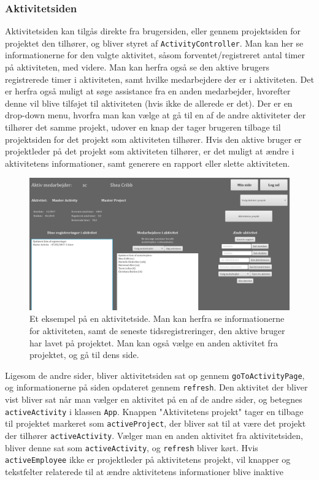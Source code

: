 
\subsubsection{Aktivitetsiden}
Aktivitetsiden kan tilgås direkte fra brugersiden, eller gennem projektsiden for projektet den tilhører, og bliver styret af \texttt{ActivityController}. Man kan her se informationerne for den valgte aktivitet, såsom forventet/registreret antal timer på aktiviteten, med videre. Man kan herfra også se den aktive brugers registrerede timer i aktiviteten, samt hvilke medarbejdere der er i aktiviteten. Det er herfra også muligt at søge assistance fra en anden medarbejder, hvorefter denne vil blive tilføjet til aktiviteten (hvis ikke de allerede er det). Der er en drop-down menu, hvorfra man kan vælge at gå til en af de andre aktiviteter der tilhører det samme projekt, udover en knap der tager brugeren tilbage til projektsiden for det projekt som aktiviteten tilhører. Hvis den aktive bruger er projektleder på det projekt som aktiviteten tilhører, er det muligt at ændre i aktivitetens informationer, samt generere en rapport eller slette aktiviteten. 

\begin{figure}[H]
    \centering
    \includegraphics[width = \textwidth]{Figurer/activityPage}
    \caption{Et eksempel på en aktivitetside. Man kan herfra se informationerne for aktiviteten, samt de seneste tidsregistreringer, den aktive bruger har lavet på projektet. Man kan også vælge en anden aktivitet fra projektet, og gå til dens side.}
    \label{fig:activityPage}
\end{figure}

Ligesom de andre sider, bliver aktivitetsiden sat op gennem \texttt{goToActivityPage}, og informationerne på siden opdateret gennem \texttt{refresh}. Den aktivitet der bliver vist bliver sat når man vælger en aktivitet på en af de andre sider, og betegnes \texttt{activeActivity} i klassen \texttt{App}. Knappen "Aktivitetens projekt" tager en tilbage til projektet markeret som \texttt{activeProject}, der bliver sat til at være det projekt der tilhører \texttt{activeActivity}. Vælger man en anden aktivitet fra aktivitetsiden, bliver denne sat som \texttt{activeActivity}, og \texttt{refresh} bliver kørt. Hvis \texttt{activeEmployee} ikke er projektleder på aktivitetens projekt, vil knapper og tekstfelter relaterede til at ændre aktivitetens informationer blive inaktive

